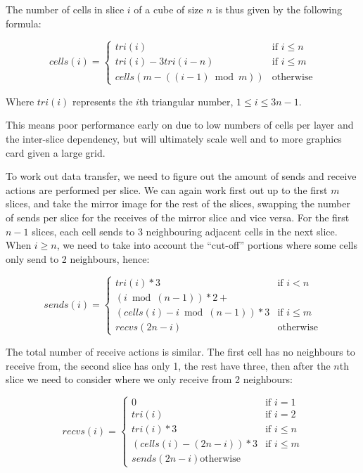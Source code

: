 \documentclass[conference]{IEEEtran}
\begin{document}
The number of cells in slice $ i $ of a cube of size $ n $ is thus given by the following formula:

\begin{equation}
cells(i) = \left\{
	\begin{array}{ll}
		tri(i) & \mbox{if } i \le n \\
		tri(i) - 3tri(i - n) & \mbox{if } i \le m \\
		cells(m - ((i - 1)\bmod m)) & \mbox{otherwise}
	\end{array}
\right.
\end{equation}

Where $ tri(i) $ represents the $i$th triangular number, $ 1 \le i \le 3n - 1 $. 

This means poor performance early on due to low numbers of cells per layer and the inter-slice dependency, but will ultimately scale well and to more graphics card given a large grid.

To work out data transfer, we need to figure out the amount of sends and receive actions are performed per slice. We can again work first out up to the first $ m $ slices, and take the mirror image for the rest of the slices, swapping the number of sends per slice for the receives of the mirror slice and vice versa. For the first $ n - 1 $ slices, each cell sends to 3 neighbouring adjacent cells in the next slice. When $ i \ge n $, we need to take into account the ``cut-off'' portions where some cells only send to 2 neighbours, hence:

\begin{equation}
sends(i) = \left\{
	\begin{array}{ll}
		tri(i) * 3 & \mbox{if } i < n \\
		(i\bmod(n - 1)) * 2 + \\
			(cells(i) - i\bmod(n - 1)) * 3 & \mbox{if } i \le m \\
		recvs(2n - i) & \mbox{otherwise}
	\end{array}
\right.
\end{equation}

The total number of receive actions is similar. The first cell has no neighbours to receive from, the second slice has only 1, the rest have three, then after the $n$th slice we need to consider where we only receive from 2 neighbours:

\begin{equation}
recvs(i) = \left\{
	\begin{array}{ll}
		0 & \mbox{if } i = 1 \\
		tri(i) & \mbox{if } i = 2 \\
		tri(i) * 3 & \mbox{if } i \le n \\
		(cells(i) - (2n - i)) * 3 & \mbox{if } i \le m \\
		sends(2n - i) \mbox{otherwise}
	\end{array}
\right.
\end{equation}
\end{document}
